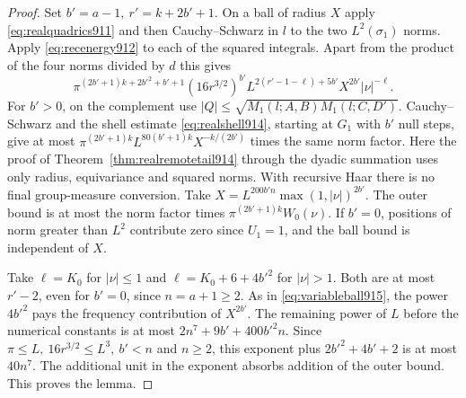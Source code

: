 \documentclass[a4paper,11pt]{article}
\theoremstyle{definition}
\theoremstyle{remark}
\numberwithin{equation}{section}
\begin{document}
\begin{proof}
Set \(b'=a-1,\ r'=k+2b'+1\). On a ball of radius \(X\)
apply \eqref{eq:realquadrics911} and then Cauchy--Schwarz
in \(l\) to the two \(L^2(\sigma_1)\) norms. Apply
\eqref{eq:recenergy912} to each of the squared integrals.
Apart from the product of the four norms divided by \(d\)
this gives
\[
 \pi^{(2b'+1)k+2b'^2+b'+1}(16r^{3/2})^{b'}
    L^{2(r'-1-\ell)+5b'}X^{2b'}|\nu|^{-\ell}.
\]
For \(b'>0\), on the complement use
\(|Q|\le\sqrt{M_1(l;A,B)M_1(l;C,D')}\). Cauchy--Schwarz
and the shell estimate \eqref{eq:realshell914}, starting at
\(G_1\) with \(b'\) null steps, give at most
\(\pi^{(2b'+1)k}L^{80(b'+1)k}X^{-k/(2b')}\) times the
same norm factor. Here the proof of
Theorem~\ref{thm:realremotetail914} through the dyadic
summation uses only radius, equivariance and squared norms.
With recursive Haar there is no final group-measure conversion.
Take \(X=L^{200 b'n}\max(1,|\nu|)^{2b'}\).
The outer bound is at most the norm factor times
\(\pi^{(2b'+1)k}W_0(\nu)\). If \(b'=0\), positions of
norm greater than \(L^2\) contribute zero since \(U_1=1\),
and the ball bound is independent of \(X\).

Take \(\ell=K_0\) for \(|\nu|\le1\) and
\(\ell=K_0+6+4b'^2\) for \(|\nu|>1\).
Both are at most \(r'-2\), even for \(b'=0\), since
\(n=a+1\ge2\). As in \eqref{eq:variableball915}, the
power \(4b'^2\) pays the frequency contribution of \(X^{2b'}\).
The remaining power of \(L\) before the numerical constants
is at most \(2n^7+9b'+400b'^2 n\). Since
\(\pi\le L,\ 16r^{3/2}\le L^3,\ b'<n\) and \(n\ge2\),
this exponent plus \(2b'^2+4b'+2\) is at most \(40n^7\).
The additional unit in the exponent absorbs addition of the
outer bound. This proves the lemma.
\end{proof}
\end{document}
